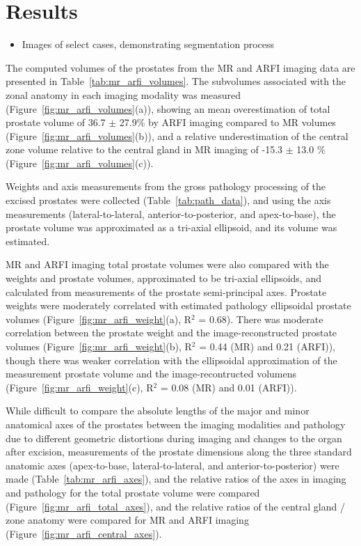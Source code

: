 \section{Results}\label{sect:results}

\begin{itemize}
    \item Images of select cases, demonstrating segmentation process
\end{itemize}

The computed volumes of the prostates from the MR and ARFI imaging data are
presented in Table~\ref{tab:mr_arfi_volumes}.  The subvolumes associated
with the zonal anatomy in each imaging modality was measured
(Figure~\ref{fig:mr_arfi_volumes}(a)), showing an mean overestimation of
total prostate volume of 36.7 $\pm$ 27.9\% by ARFI imaging compared to MR
volumes (Figure~\ref{fig:mr_arfi_volumes}(b)), and a relative
underestimation of the central zone volume relative to the central gland in MR
imaging of -15.3 $\pm$ 13.0 \% (Figure~\ref{fig:mr_arfi_volumes}(c)).





Weights and axis measurements from the gross pathology processing of the
excised prostates were collected (Table~\ref{tab:path_data}), and using the
axis measurements (lateral-to-lateral, anterior-to-posterior, and
apex-to-base), the prostate volume was approximated as a tri-axial ellipsoid,
and its volume was estimated.



MR and ARFI imaging total prostate volumes were also compared with the weights
and prostate volumes, approximated to be tri-axial ellipsoids, and calculated
from measurements of the prostate semi-principal axes.  Prostate weights were
moderately correlated with estimated pathology ellipsoidal prostate volumes
(Figure~\ref{fig:mr_arfi_weight}(a), R$^2$ = 0.68).  There was moderate
correlation between the prostate weight and the image-reconstructed prostate
volumes (Figure~\ref{fig:mr_arfi_weight}(b), R$^2$ = 0.44 (MR) and 0.21
(ARFI)), though there was weaker correlation with the ellipsoidal approximation
of the measurement prostate volume and the image-recontructed volumens
(Figure~\ref{fig:mr_arfi_weight}(c), R$^2$ = 0.08 (MR) and 0.01 (ARFI)).  



While difficult to compare the absolute lengths of the major and minor
anatomical axes of the prostates between the imaging modalities and pathology
due to different geometric distortions during imaging and changes to the organ
after excision, measurements of the prostate dimensions along the three
standard anatomic axes (apex-to-base, lateral-to-lateral, and
anterior-to-posterior) were made (Table~\ref{tab:mr_arfi_axes}), and the
relative ratios of the axes in imaging and pathology for the total prostate
volume were compared (Figure~\ref{fig:mr_arfi_total_axes}), and the relative
ratios of the central gland / zone anatomy were compared for MR and ARFI
imaging (Figure~\ref{fig:mr_arfi_central_axes}).






